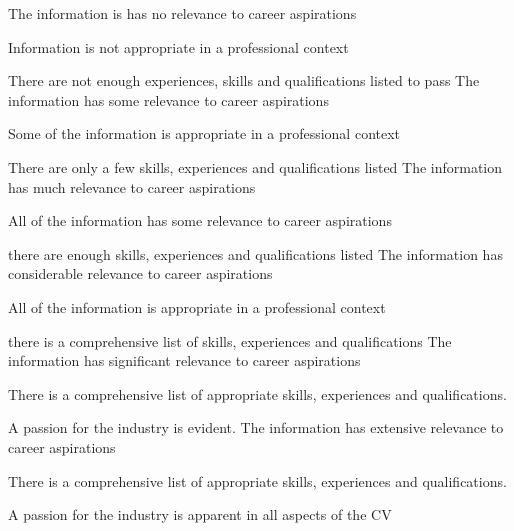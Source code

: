 \documentclass{../../fal_assignment}
\begin{document}
\begin{markingrubric}
        \grade \fail  	The information is has no relevance to career aspirations
        		\par 			Information is not appropriate in a professional context			
        		\par 			There are not enough experiences, skills and qualifications listed to pass
        \grade 		The information has some relevance to career aspirations
        		\par 			Some of the information is appropriate in a professional context
        		\par 			There are only a few skills, experiences and qualifications listed 
	\grade 		The information has much relevance to career aspirations
		\par			All of the information has some relevance to career aspirations
		\par			there are enough skills, experiences and qualifications listed 
        \grade 		The information has considerable relevance to career aspirations
        		\par 			All of the information is appropriate in a professional context
		\par			there is a comprehensive list of skills, experiences and qualifications
        \grade 		The information has significant relevance to career aspirations
        		\par			There is a comprehensive list of appropriate skills, experiences and qualifications.
		\par			A passion for the industry is evident.
        \grade 		The information has extensive relevance to career aspirations	
      		\par 			There is a comprehensive list of appropriate skills, experiences and qualifications.
		\par 			A passion for the industry is apparent in all aspects of the CV
        

\end{markingrubric}
\end{document}
